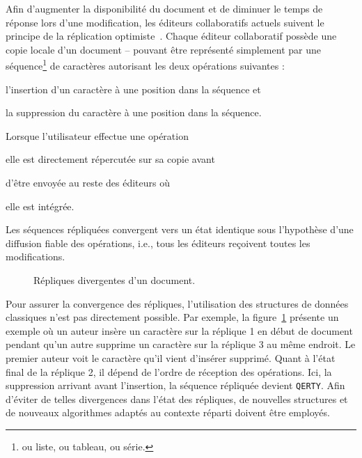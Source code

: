 Afin d'augmenter la disponibilité du document et de diminuer le temps de réponse
lors d'une modification, les éditeurs collaboratifs actuels suivent le principe
de la réplication optimiste~\cite{saito2005optimistic}. Chaque éditeur
collaboratif possède une copie locale d'un document -- pouvant être représenté
simplement par une séquence\footnote{ou liste, ou tableau, ou série.} de
caractères autorisant les deux opérations suivantes :
\begin{inparaenum}[(a)]
\item l'insertion d'un caractère à une position dans la séquence et
\item la suppression du caractère à une position dans la séquence.
\end{inparaenum}
Lorsque l'utilisateur effectue une opération
\begin{inparaenum}[(i)]
\item elle est directement répercutée sur sa copie avant
\item d'être envoyée au reste des éditeurs où
\item elle est intégrée.
\end{inparaenum}
Les séquences répliquées convergent vers un état identique sous l'hypothèse
d'une diffusion fiable des opérations, i.e., tous les éditeurs reçoivent toutes
les modifications.

\begin{figure}
  
  \caption{\label{intro:fig:ripconvergence} Répliques divergentes d'un
    document.}
\end{figure}

Pour assurer la convergence des répliques, l'utilisation des structures de
données \og classiques \fg n'est pas directement possible. %
Par exemple, la figure~\ref{intro:fig:ripconvergence} présente un exemple où un
auteur insère un caractère sur la réplique 1 en début de document pendant qu'un
autre supprime un caractère sur la réplique 3 au même endroit. Le premier auteur
voit le caractère qu'il vient d'insérer supprimé. Quant à l'état final de la
réplique 2, il dépend de l'ordre de réception des opérations. Ici, la
suppression arrivant avant l'insertion, la séquence répliquée devient
\texttt{QERTY}.  Afin d'éviter de telles divergences dans l'état des répliques,
de nouvelles structures et de nouveaux algorithmes adaptés au contexte réparti
doivent être employés.

